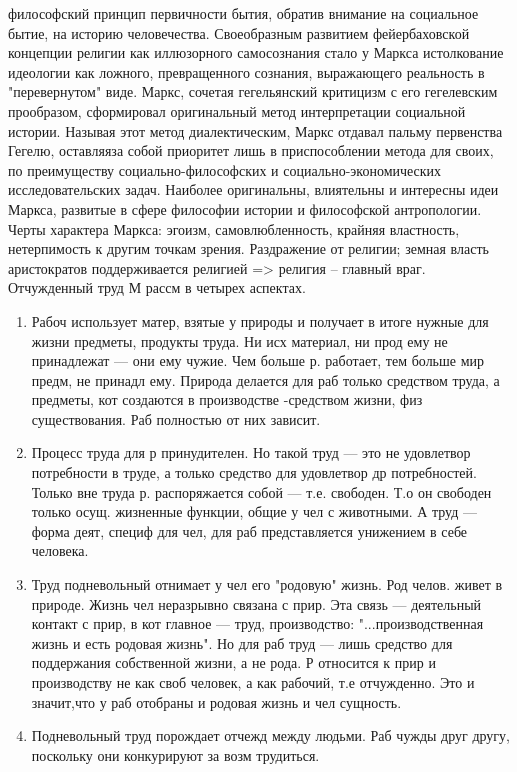 \documentclass[12pt]{article}
\begin{document}
философский принцип первичности бытия, обратив внимание на социальное бытие, на историю человечества.
Своеобразным развитием фейербаховской концепции религии как иллюзорного самосознания стало у Маркса
истолкование идеологии как ложного, превращенного сознания, выражающего реальность в "перевернутом"
виде.
Маркс,  сочетая  гегельянский  критицизм  с  его  гегелевским  прообразом,  сформировал  оригинальный  метод
интерпретации социальной истории. Называя этот метод диалектическим, Маркс отдавал пальму первенства
Гегелю, оставляяза собой приоритет лишь в приспособлении метода для своих, по преимуществу социально-философских  и  социально-экономических  исследовательских  задач.  Наиболее  оригинальны,  влиятельны  и
интересны идеи Маркса, развитые в сфере философии истории и философской антропологии. 
Черты  характера  Маркса:  эгоизм,  самовлюбленность,  крайняя  властность,  нетерпимость  к  другим  точкам
зрения. Раздражение от религии; земная власть аристократов поддерживается религией => религия – главный
враг.
Отчужденный труд М рассм в четырех аспектах.
\begin{enumerate}
  \item Рабоч использует матер, взятые у природы и получает в итоге нужные для жизни предметы, продукты труда.
Ни исх материал, ни прод ему не принадлежат --- они ему чужие. Чем больше р. работает, тем больше мир предм,
не принадл ему. Природа делается для раб только средством труда, а предметы, кот создаются в производстве -средством жизни, физ существования. Раб полностью от них зависит.
\item Процесс труда для р принудителен. Но такой труд --- это не удовлетвор потребности в труде, а только средство
для удовлетвор др потребностей. Только вне труда р. распоряжается собой --- т.е. свободен. Т.о он свободен
только осущ. жизненные функции, общие у чел с животными. А труд --- форма деят, специф для чел, для раб
представляется унижением в себе человека.
\item Труд подневольный отнимает у чел его "родовую" жизнь. Род челов. живет в природе. Жизнь чел неразрывно
связана с прир. Эта связь --- деятельный контакт с прир, в кот главное --- труд, производство: "...производственная
жизнь и есть родовая жизнь". Но для раб труд --- лишь средство для поддержания собственной жизни, а не рода.
Р относится к прир и производству не как своб человек, а как рабочий, т.е отчужденно. Это и значит,что у раб
отобраны и родовая жизнь и чел сущность.
\item Подневольный труд порождает отчежд между людьми. Раб чужды друг другу, поскольку они конкурируют за
возм трудиться.
\end{enumerate}
\end{document}
